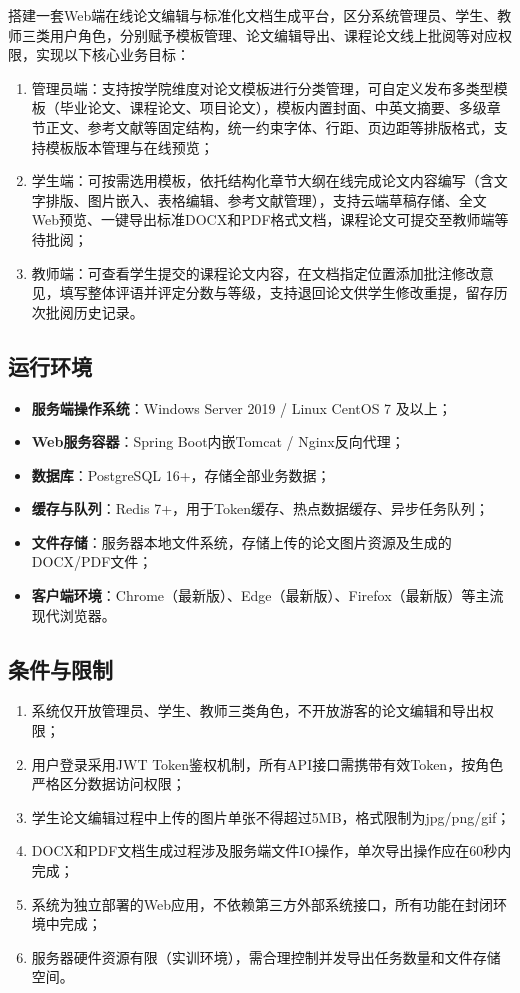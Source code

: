 搭建一套Web端在线论文编辑与标准化文档生成平台，区分系统管理员、学生、教师三类用户角色，分别赋予模板管理、论文编辑导出、课程论文线上批阅等对应权限，实现以下核心业务目标：

\begin{enumerate}
    \item 管理员端：支持按学院维度对论文模板进行分类管理，可自定义发布多类型模板（毕业论文、课程论文、项目论文），模板内置封面、中英文摘要、多级章节正文、参考文献等固定结构，统一约束字体、行距、页边距等排版格式，支持模板版本管理与在线预览；
    \item 学生端：可按需选用模板，依托结构化章节大纲在线完成论文内容编写（含文字排版、图片嵌入、表格编辑、参考文献管理），支持云端草稿存储、全文Web预览、一键导出标准DOCX和PDF格式文档，课程论文可提交至教师端等待批阅；
    \item 教师端：可查看学生提交的课程论文内容，在文档指定位置添加批注修改意见，填写整体评语并评定分数与等级，支持退回论文供学生修改重提，留存历次批阅历史记录。
\end{enumerate}

\subsection{运行环境}

\begin{itemize}
    \item \textbf{服务端操作系统}：Windows Server 2019 / Linux CentOS 7 及以上；
    \item \textbf{Web服务容器}：Spring Boot内嵌Tomcat / Nginx反向代理；
    \item \textbf{数据库}：PostgreSQL 16+，存储全部业务数据；
    \item \textbf{缓存与队列}：Redis 7+，用于Token缓存、热点数据缓存、异步任务队列；
    \item \textbf{文件存储}：服务器本地文件系统，存储上传的论文图片资源及生成的DOCX/PDF文件；
    \item \textbf{客户端环境}：Chrome（最新版）、Edge（最新版）、Firefox（最新版）等主流现代浏览器。
\end{itemize}

\subsection{条件与限制}

\begin{enumerate}
    \item 系统仅开放管理员、学生、教师三类角色，不开放游客的论文编辑和导出权限；
    \item 用户登录采用JWT Token鉴权机制，所有API接口需携带有效Token，按角色严格区分数据访问权限；
    \item 学生论文编辑过程中上传的图片单张不得超过5MB，格式限制为jpg/png/gif；
    \item DOCX和PDF文档生成过程涉及服务端文件IO操作，单次导出操作应在60秒内完成；
    \item 系统为独立部署的Web应用，不依赖第三方外部系统接口，所有功能在封闭环境中完成；
    \item 服务器硬件资源有限（实训环境），需合理控制并发导出任务数量和文件存储空间。
\end{enumerate}

